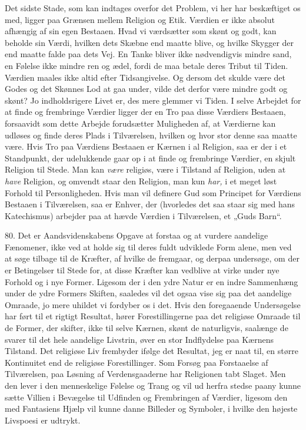 \documentclass[12pt,a4paper,openany]{book}
\newcommand{\opage}[1]{\marginnote{\footnotesize\textit{[#1]}}}
\begin{document}
Det sidste Stade, som kan indtages overfor det Problem, vi her har
beskæftiget os med, ligger paa Grænsen mellem Religion og Etik. Værdien
er ikke absolut afhængig af sin egen Bestaaen. Hvad vi værdsætter som
skønt og godt, kan beholde sin Værdi, hvilken dets Skæbne end maatte
blive, og hvilke Skygger der end maatte falde paa dets Vej. En Tanke
bliver ikke nødvendigvis mindre sand, en Følelse ikke mindre ren og
ædel, fordi de maa betale deres Tribut til Tiden. Værdien maales ikke
altid efter Tidsangivelse. Og dersom det skulde være det Godes
\opage{185}og det Skønnes Lod at gaa under, vilde det derfor være mindre
godt og skønt? Jo indholdsrigere Livet er, des mere glemmer vi Tiden. I
selve Arbejdet for at finde og frembringe Værdier ligger der en Tro paa
disse Værdiers Bestaaen, forsaavidt som dette Arbejde forudsætter
Muligheden af, at Værdierne kan udløses og finde deres Plads i
Tilværelsen, hvilken og hvor stor denne saa maatte være. Hvis Tro paa
Værdiens Bestaaen er Kærnen i al Religion, saa er der i et Standpunkt,
der udelukkende gaar op i at finde og frembringe Værdier, en skjult
Religion til Stede. Man kan \textit{være} religiøs, være i Tilstand af
Religion, uden at \textit{have} Religion, og omvendt staar den Religion,
man kun \textit{har,} i et meget løst Forhold til Personligheden. Hvis
man vil definere Gud som Principet for Værdiens Bestaaen i Tilværelsen,
saa er Enhver, der (hvorledes det saa staar sig med hans Katechismus)
arbejder paa at hævde Værdien i Tilværelsen, et „Guds Barn“.

80. Det er Aandsvidenskabens Opgave at forstaa og at vurdere aandelige
Fænomener, ikke ved at holde sig til deres fuldt udviklede Form alene,
men ved at søge tilbage til de Kræfter, af hvilke de fremgaar, og derpaa
undersøge, om der er Betingelser til Stede for, at disse Kræfter kan
vedblive at virke under nye Forhold og i nye Former. Ligesom der i den
ydre Natur er en indre Sammenhæng under de ydre Formers Skiften,
saaledes vil det ogsaa vise sig paa det aandelige Omraade, jo mere
uhildet vi fordyber os i det. Hvis den foregaaende Undersøgelse har ført
til et rigtigt Resultat, hører Forestillingerne paa det religiøse
Omraade til de Former, der skifter, ikke til selve Kærnen, skønt de
naturligvis, saalænge de svarer til det hele aandelige Livstrin, øver en
stor Indflydelse paa Kærnens Tilstand. Det religiøse Liv frembyder
ifølge det Resultat, jeg er naat til, en større Kontinuitet end de
religiøse Forestillinger. Som Forsøg paa Forstaaelse af Tilværelsen, paa
Løsning af Verdensgaaderne har Religionen tabt Slaget. Men den lever i
den menneskelige Følelse og Trang og vil ud herfra stedse paany kunne
sætte Villien i Bevægelse til Udfinden og Frembringen af Værdier,
ligesom den med Fantasiens Hjælp vil kunne danne Billeder og Symboler, i
hvilke den højeste Livspoesi er udtrykt.
\end{document}
